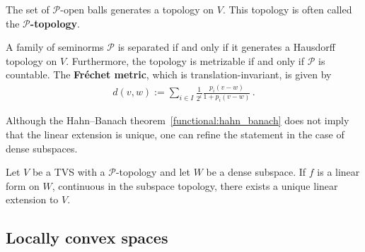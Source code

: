     \begin{property}
        The set of $\mathscr{P}$-open balls generates a topology on $V$. This topology is often called the \textbf{$\mathscr{P}$-topology}.
    \end{property}

    \begin{property}\label{functional:separated_metric}
        A family of seminorms $\mathcal{P}$ is separated if and only if it generates a Hausdorff topology on $V$. Furthermore, the topology is metrizable if and only if $\mathcal{P}$ is countable. The \textbf{Fr\'echet metric}, which is translation-invariant, is given by
        \begin{gather}
            d(v,w) := \sum_{i\in I}\frac{1}{2^i}\frac{p_i(v-w)}{1 + p_i(v-w)}\,.
        \end{gather}
    \end{property}

    Although the Hahn--Banach theorem~\ref{functional:hahn_banach} does not imply that the linear extension is unique, one can refine the statement in the case of dense subspaces.
    \begin{result}
        Let $V$ be a TVS with a $\mathscr{P}$-topology and let $W$ be a dense subspace. If $f$ is a linear form on $W$, continuous in the subspace topology, there exists a unique linear extension to $V$.
    \end{result}

\subsection{Locally convex spaces}

